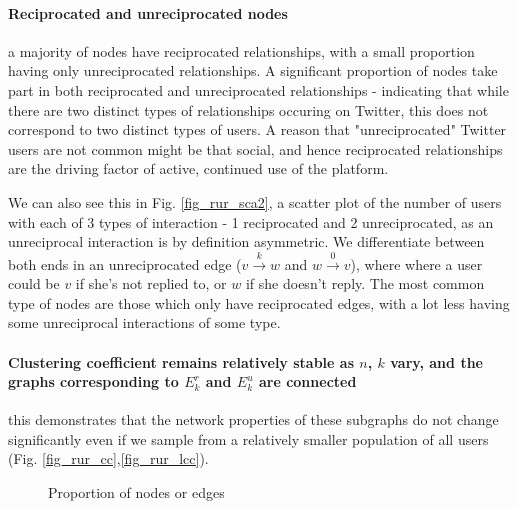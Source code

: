 \documentclass[conference]{IEEEtran}
\begin{document}
\paragraph{Reciprocated and unreciprocated nodes} a majority of nodes have reciprocated relationships, with a small proportion having only unreciprocated relationships. A significant proportion of nodes take part in both reciprocated and unreciprocated relationships - indicating that while there are two distinct types of relationships occuring on Twitter, this does not correspond to two distinct types of users. A reason that "unreciprocated" Twitter users are not common might be that social, and hence reciprocated relationships are the driving factor of active, continued use of the platform. 

We can also see this in Fig. \ref{fig_rur_sca2}, a scatter plot of the number of users with each of 3 types of interaction - 1 reciprocated and 2 unreciprocated, as an unreciprocal interaction is by definition asymmetric. We differentiate between both ends in an unreciprocated edge ($v \xrightarrow{k} w$ and $w \xrightarrow{0} v$), where where a user could be $v$ if she's not replied to, or $w$ if she doesn't reply. The most common type of nodes are those which only have reciprocated edges, with a lot less having some unreciprocal interactions of some type.

\paragraph{Clustering coefficient remains relatively stable as $n$, $k$ vary, and the graphs corresponding to $E_k^r$ and $E_k^u$ are connected} this demonstrates that the network properties of these subgraphs do not change significantly even if we sample from a relatively smaller population of all users (Fig. \ref{fig_rur_cc},\ref{fig_rur_lcc}).

\begin{figure}[!t]
\centering
{}                
\caption{Proportion of nodes or edges}
\label{fig_rur_propne}
\end{figure}
\end{document}
